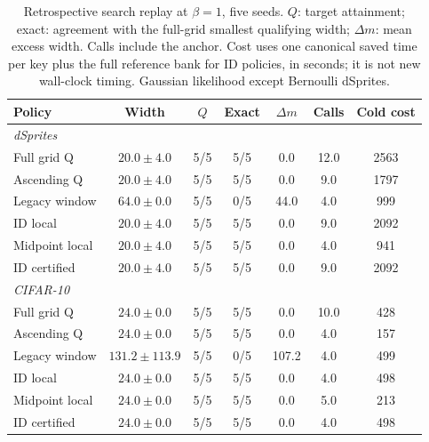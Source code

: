 \begin{table}[H]
\caption{Retrospective search replay at $\beta=1$, five seeds. $Q$: target attainment; exact: agreement with the full-grid smallest qualifying width; $\Delta m$: mean excess width. Calls include the anchor. Cost uses one canonical saved time per key plus the full reference bank for ID policies, in seconds; it is not new wall-clock timing. Gaussian likelihood except Bernoulli dSprites.}\label{tab:replay2}
\small
\setlength{\tabcolsep}{3pt}
\begin{tabular*}{\textwidth}{@{\extracolsep{\fill}}lcccccc@{}}
\toprule
Policy & Width & $Q$ & Exact & $\Delta m$ & Calls & Cold cost \\
\midrule
\multicolumn{7}{l}{\emph{dSprites}} \\
Full grid Q & $20.0 \pm 4.0$ & 5/5 & 5/5 & 0.0 & 12.0 & 2563 \\
Ascending Q & $20.0 \pm 4.0$ & 5/5 & 5/5 & 0.0 & 9.0 & 1797 \\
Legacy window & $64.0 \pm 0.0$ & 5/5 & 0/5 & 44.0 & 4.0 & 999 \\
ID local & $20.0 \pm 4.0$ & 5/5 & 5/5 & 0.0 & 9.0 & 2092 \\
Midpoint local & $20.0 \pm 4.0$ & 5/5 & 5/5 & 0.0 & 4.0 & 941 \\
ID certified & $20.0 \pm 4.0$ & 5/5 & 5/5 & 0.0 & 9.0 & 2092 \\
\midrule
\multicolumn{7}{l}{\emph{CIFAR-10}} \\
Full grid Q & $24.0 \pm 0.0$ & 5/5 & 5/5 & 0.0 & 10.0 & 428 \\
Ascending Q & $24.0 \pm 0.0$ & 5/5 & 5/5 & 0.0 & 4.0 & 157 \\
Legacy window & $131.2 \pm 113.9$ & 5/5 & 0/5 & 107.2 & 4.0 & 499 \\
ID local & $24.0 \pm 0.0$ & 5/5 & 5/5 & 0.0 & 4.0 & 498 \\
Midpoint local & $24.0 \pm 0.0$ & 5/5 & 5/5 & 0.0 & 5.0 & 213 \\
ID certified & $24.0 \pm 0.0$ & 5/5 & 5/5 & 0.0 & 4.0 & 498 \\
\bottomrule\end{tabular*}
\end{table}
